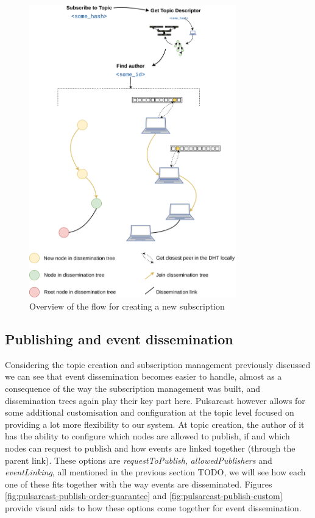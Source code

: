 \begin{figure}[hb!]
  \centering
  \includegraphics[width=0.8\textwidth]{img/pulsarcast-subscription-flow.png}
  \caption{Overview of the flow for creating a new subscription}
  \label{fig:pulsarcast-subscription-flow}
\end{figure}

\subsection{Publishing and event dissemination}\label{subsec:publishing-and-event-dissemination}

Considering the topic creation and subscription management previously discussed
we can see that event dissemination becomes easier to handle, almost as a
consequence of the way the subscription management was built, and dissemination
trees again play their key part here. Pulsarcast however allows for some
additional customisation and configuration at the topic level focused on
providing a lot more flexibility to our system. At topic creation, the author
of it has the ability to configure which nodes are allowed to publish, if and
which nodes can request to publish and how events are linked together (through
the parent link). These options are \emph{requestToPublish},
\emph{allowedPublishers} and \emph{eventLinking}, all mentioned in the previous
section TODO, we will see how each one of these fits together with the way
events are disseminated. Figures \ref{fig:pulsarcast-publish-order-guarantee}
and \ref{fig:pulsarcast-publish-custom} provide visual aids to how these
options come together for event dissemination.

